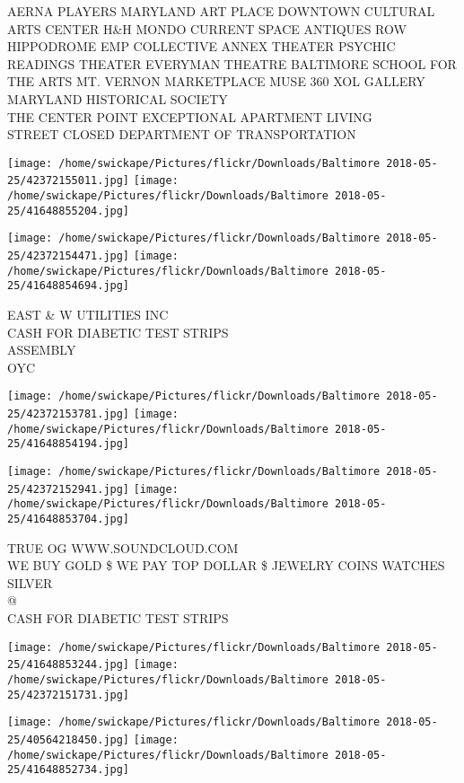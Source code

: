 \documentclass[10pt,letterpaper]{article}
\begin{document}
AERNA PLAYERS MARYLAND ART PLACE DOWNTOWN CULTURAL ARTS CENTER H\&H MONDO CURRENT SPACE ANTIQUES ROW\\
HIPPODROME EMP COLLECTIVE ANNEX THEATER PSYCHIC READINGS THEATER EVERYMAN THEATRE BALTIMORE SCHOOL FOR THE ARTS MT. VERNON MARKETPLACE MUSE 360 XOL GALLERY MARYLAND HISTORICAL SOCIETY\\
THE CENTER POINT EXCEPTIONAL APARTMENT LIVING\\
STREET CLOSED DEPARTMENT OF TRANSPORTATION\\
\pagebreak

\texttt{[image: /home/swickape/Pictures/flickr/Downloads/Baltimore 2018-05-25/42372155011.jpg]}
\texttt{[image: /home/swickape/Pictures/flickr/Downloads/Baltimore 2018-05-25/41648855204.jpg]}

\texttt{[image: /home/swickape/Pictures/flickr/Downloads/Baltimore 2018-05-25/42372154471.jpg]}
\texttt{[image: /home/swickape/Pictures/flickr/Downloads/Baltimore 2018-05-25/41648854694.jpg]}

EAST  \& W UTILITIES INC\\
CASH FOR DIABETIC TEST STRIPS\\
ASSEMBLY\\
OYC\\
\pagebreak

\texttt{[image: /home/swickape/Pictures/flickr/Downloads/Baltimore 2018-05-25/42372153781.jpg]}
\texttt{[image: /home/swickape/Pictures/flickr/Downloads/Baltimore 2018-05-25/41648854194.jpg]}

\texttt{[image: /home/swickape/Pictures/flickr/Downloads/Baltimore 2018-05-25/42372152941.jpg]}
\texttt{[image: /home/swickape/Pictures/flickr/Downloads/Baltimore 2018-05-25/41648853704.jpg]}

TRUE OG WWW.SOUNDCLOUD.COM\\
WE BUY GOLD \$ WE PAY TOP DOLLAR \$ JEWELRY COINS WATCHES SILVER\\
@\\
CASH FOR DIABETIC TEST STRIPS\\
\pagebreak

\texttt{[image: /home/swickape/Pictures/flickr/Downloads/Baltimore 2018-05-25/41648853244.jpg]}
\texttt{[image: /home/swickape/Pictures/flickr/Downloads/Baltimore 2018-05-25/42372151731.jpg]}

\texttt{[image: /home/swickape/Pictures/flickr/Downloads/Baltimore 2018-05-25/40564218450.jpg]}
\texttt{[image: /home/swickape/Pictures/flickr/Downloads/Baltimore 2018-05-25/41648852734.jpg]}
\end{document}
